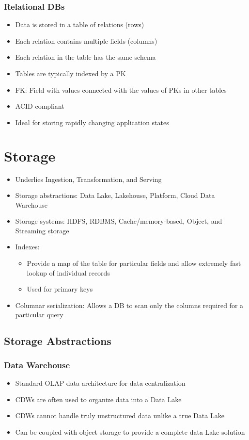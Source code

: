 \documentclass[11pt]{scrartcl}
\begin{document}
\subsubsection*{Relational DBs}
\begin{itemize}
	\item Data is stored in a table of relations (rows)
	\item Each relation contains multiple fields (columns)
	\item Each relation in the table has the same schema
	\item Tables are typically indexed by a PK
	\item FK: Field with values connected with the values of PKs in other tables
	\item ACID compliant
	\item Ideal for storing rapidly changing application states
\end{itemize}


\section*{Storage}
\begin{itemize}
	\item Underlies Ingestion, Transformation, and Serving
	\item Storage abstractions: Data Lake, Lakehouse, Platform, Cloud Data Warehouse
	\item Storage systems: HDFS, RDBMS, Cache/memory-based, Object, and Streaming storage
	\item Indexes: 
	\begin{itemize}
		\item Provide a map of the table for particular fields and allow extremely fast lookup of individual records
		\item Used for primary keys
	\end{itemize}
	\item Columnar serialization: Allows a DB to scan only the columns required for a particular query
\end{itemize}

\subsection*{Storage Abstractions}
\subsubsection*{Data Warehouse}
\begin{itemize}
	\item Standard OLAP data architecture for data centralization
	\item CDWs are often used to organize data into a Data Lake
	\item CDWs cannot handle truly unstructured data unlike a true Data Lake
	\item Can be coupled with object storage to provide a complete data Lake solution
\end{itemize}
\end{document}
